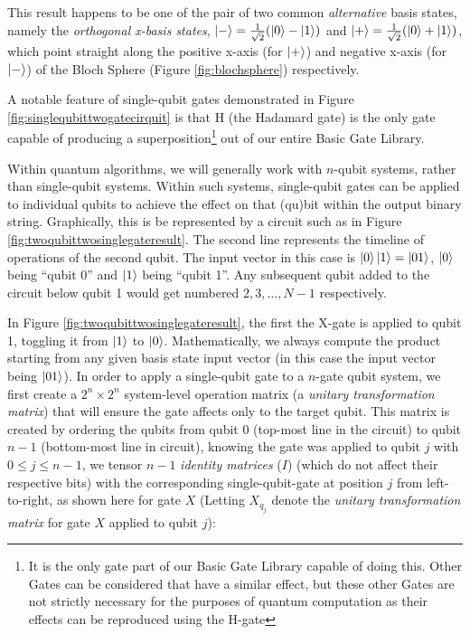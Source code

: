 \documentclass[conference]{IEEEtran}
\begin{document}
This result happens to be one of the pair of two common \textit{alternative} basis states, namely the \textit{orthogonal x-basis states}, $\ket{-}=\frac{1}{\sqrt{2}}(\ket{0}-\ket{1})$ and $\ket{+}=\frac{1}{\sqrt{2}}(\ket{0}+\ket{1})$,
which point straight along the positive x-axis (for $\ket{+}$) and negative x-axis (for $\ket{-}$) of the Bloch Sphere (Figure \ref{fig:blochsphere}) respectively.

A notable feature of single-qubit gates demonstrated in Figure \ref{fig:singlequbittwogatecirquit}
is that H (the Hadamard gate) is the only gate capable of producing
a superposition\footnote{It is the only gate part of our Basic Gate Library capable of doing this.
Other Gates can be considered that have a similar effect, but these other Gates are not strictly necessary for the
purposes of quantum computation as their effects can be reproduced using the H-gate}
out of our entire Basic Gate Library. %

Within quantum algorithms, we will generally work with $n$-qubit systems, rather than single-qubit systems.
Within such systems, single-qubit gates can be applied to individual qubits to achieve the effect on that (qu)bit
within the output binary string.
Graphically, this is be represented by a circuit such as in Figure \ref{fig:twoqubittwosinglegateresult}.
The second line represents the timeline of operations of the second qubit.
The input vector in this case is $\ket{0}\ket{1}=\ket{01}$,
$\ket{0}$ being ``qubit 0'' and $\ket{1}$ being ``qubit 1''.
Any subsequent qubit added to the circuit below qubit 1 would get numbered ${2,3,\dots,N-1}$ respectively.

In Figure \ref{fig:twoqubittwosinglegateresult}, the first the X-gate is applied to qubit 1, toggling it from $\ket{1}$ to $\ket{0}$.
Mathematically, we always compute the product starting from any given basis state input vector (in this case the input vector being $\ket{01}$).
In order to apply a single-qubit gate to a $n$-gate qubit system,
we first create a $2^n\times2^n$ system-level operation matrix (a \textit{unitary transformation matrix}) that will ensure the gate affects only to the target qubit.
This matrix is created by ordering the qubits from qubit $0$ (top-most line in the circuit) to qubit $n-1$ (bottom-most line in circuit),
knowing the gate was applied to qubit $j$ with $0 \le j \le n-1$, we tensor $n-1$
\textit{identity matrices} ($I$) (which do not affect their respective bits)
with the corresponding single-qubit-gate at position $j$ from left-to-right,
as shown here for gate $X$ (Letting $X_{q_{j}}$ denote the \textit{unitary transformation matrix} for gate $X$ applied to qubit $j$):
\end{document}
